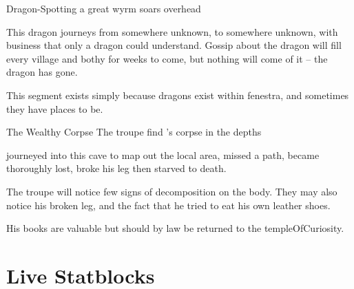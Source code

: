 \begin{multicols}{2}
{Dragon-Spotting}%
{a great wyrm soars overhead}%

This dragon journeys from somewhere unknown, to somewhere unknown, with business that only a dragon could understand.
Gossip about the dragon will fill every \gls{village} and \gls{bothy} for weeks to come, but nothing will come of it -- the dragon has gone.

This \gls{segment} exists simply because dragons exist within \gls{fenestra}, and sometimes they have places to be.

{The Wealthy Corpse}%
{The troupe find 's corpse in the depths}%

\begin{exampletext}
   journeyed into this cave to map out the local area, missed a path, became thoroughly lost, broke his leg then starved to death.
\end{exampletext}

The troupe will notice few signs of decomposition on the body.
They may also notice his broken leg, and the fact that he tried to eat his own leather shoes.

His books are valuable but should by law be returned to the \gls{templeOfCuriosity}.

\stopcontents[sq]

\end{multicols}

\section{Live Statblocks}

